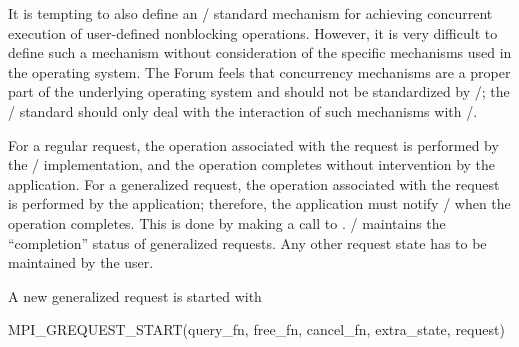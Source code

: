 \begin{rationale}
It is tempting to also define an \MPI/ standard mechanism for
achieving concurrent execution of
user-defined nonblocking operations.  
However, it is very difficult to define such a mechanism without
consideration of the specific mechanisms used in the operating system.
The Forum feels that concurrency mechanisms are a proper part
of the underlying operating system and should not be standardized by
\MPI/; the \MPI/ standard should only deal with the interaction of
such mechanisms with \MPI/.
\end{rationale}

For a regular request, the operation associated with the request is
performed by the \MPI/ implementation, and the operation
completes without intervention by the application.  For a generalized
request, the operation associated with the request is performed by the
application; therefore, the application must notify \MPI/ when the
operation completes.  This is done by making a call to
.  
\MPI/ maintains the ``completion'' status of generalized requests.  Any
other request state has to be maintained by the user. 
 
A new generalized request is started with

\begin{funcdef}{MPI\_GREQUEST\_START(query\_fn, free\_fn, cancel\_fn, extra\_state, request)}
\end{funcdef}

%




